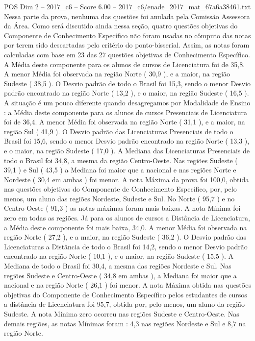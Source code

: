 \begin{textsample}{POS Dim 2 – 2017\_c6 – Score 6.00 – 2017\_c6/enade\_2017\_mat\_67a6a38461.txt}
Nessa parte da prova, nenhuma das questões foi anulada pela Comissão Assessora da Área.
Como será discutido ainda nessa seção, quatro questões objetivas do Componente de Conhecimento Específico não foram usadas no cômputo das notas por terem sido descartadas pelo critério do ponto-bisserial.
Assim, as notas foram calculadas com base em 23 das 27 questões objetivas de Conhecimento Específico.
A Média deste componente para os alunos de cursos de Licenciatura foi de 35,8.
A menor Média foi observada na região Norte ( 30,9 ), e a maior, na região Sudeste ( 38,5 ).
O Desvio padrão de todo o Brasil foi 15,3, sendo o menor Desvio padrão encontrado na região Norte ( 13,2 ), e o maior, na região Sudeste ( 16,5 ).
A situação é um pouco diferente quando desagregamos por Modalidade de Ensino : a Média deste componente para os alunos de cursos Presenciais de Licenciatura foi de 36,4.
A menor Média foi observada na região Norte ( 31,1 ), e a maior, na região Sul ( 41,9 ).
O Desvio padrão das Licenciaturas Presenciais de todo o Brasil foi 15,6, sendo o menor Desvio padrão encontrado na região Norte ( 13,3 ), e o maior, na região Sudeste ( 17,0 ).
A Mediana das Licenciaturas Presenciais de todo o Brasil foi 34,8, a mesma da região Centro-Oeste.
Nas regiões Sudeste ( 39,1 ) e Sul ( 43,5 ) a Mediana foi maior que a nacional e nas regiões Norte e Nordeste ( 30,4 em ambas ) foi menor.
A nota Máxima da prova foi 100,0, obtida nas questões objetivas do Componente de Conhecimento Específico, por, pelo menos, um aluno das regiões Nordeste, Sudeste e Sul.
No Norte ( 95,7 ) e no Centro-Oeste ( 91,3 ) as notas máximas foram mais baixas.
A nota Mínima foi zero em todas as regiões.
Já para os alunos de cursos a Distância de Licenciatura, a Média deste componente foi mais baixa, 34,0.
A menor Média foi observada na região Norte ( 27,2 ), e a maior, na região Sudeste ( 36,2 ).
O Desvio padrão das Licenciaturas a Distância de todo o Brasil foi 14,2, sendo o menor Desvio padrão encontrado na região Norte ( 10,1 ), e o maior, na região Sudeste ( 15,5 ).
A Mediana de todo o Brasil foi 30,4, a mesma das regiões Nordeste e Sul.
Nas regiões Sudeste e Centro-Oeste ( 34,8 em ambas ), a Mediana foi maior que a nacional e na região Norte ( 26,1 ) foi menor.
A nota Máxima obtida nas questões objetivas do Componente de Conhecimento Específico pelos estudantes de cursos a distância de Licenciatura foi 95,7, obtida por, pelo menos, um aluno da região Sudeste.
A nota Mínima zero ocorreu nas regiões Sudeste e Centro-Oeste.
Nas demais regiões, as notas Mínimas foram : 4,3 nas regiões Nordeste e Sul e 8,7 na região Norte.

\end{textsample}
